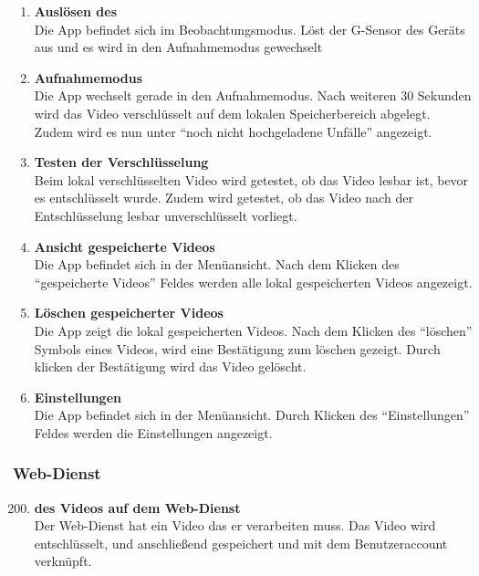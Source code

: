 \begin{enumerate}[\bfseries{T}10]
\item \textbf{Ausl\"osen des } \hfill\\  
Die \gls{App} befindet sich im Beobachtungsmodus. Löst der \gls{G-Sensor} des Ger\"ats aus und es wird in den Aufnahmemodus gewechselt

\item \textbf{Aufnahmemodus} \hfill\\  
Die \gls{App} wechselt gerade in den Aufnahmemodus. Nach weiteren 30 Sekunden wird das Video verschl\"usselt auf dem lokalen Speicherbereich abgelegt. Zudem wird es nun unter ``noch nicht hochgeladene Unf\"alle'' angezeigt. 

\item \textbf{Testen der Verschl\"usselung} \hfill\\
Beim lokal verschl\"usselten Video wird getestet, ob das Video lesbar ist, bevor es entschl\"usselt wurde. Zudem wird getestet, ob das Video nach der Entschl\"usselung lesbar unverschl\"usselt vorliegt. 

\item \textbf{Ansicht gespeicherte Videos} \hfill\\
Die \gls{App} befindet sich in der Men\"uansicht. Nach dem Klicken des ``gespeicherte Videos'' Feldes werden alle lokal gespeicherten Videos angezeigt.

\item \textbf{Löschen gespeicherter Videos} \hfill\\
Die \gls{App} zeigt die lokal gespeicherten Videos. Nach dem Klicken des ``löschen'' Symbols eines Videos, wird eine Bestätigung zum löschen gezeigt. Durch klicken der Bestätigung wird das Video gelöscht.

\item \textbf{Einstellungen} \hfill\\
Die \gls{App} befindet sich in der Men\"uansicht. Durch Klicken des ``Einstellungen'' Feldes werden die Einstellungen angezeigt.

\end{enumerate}

\subsubsection{\gls{Web-Dienst}}
\begin{enumerate}[\bfseries{T}10]  
\setcounter{enumi}{199}{}
\item \textbf{ des Videos auf dem \gls{Web-Dienst}} \hfill\\  
Der Web-Dienst hat ein Video das er verarbeiten muss. Das Video wird entschlüsselt,  und anschließend gespeichert und mit dem Benutzeraccount verkn\"upft.

\end{enumerate}

